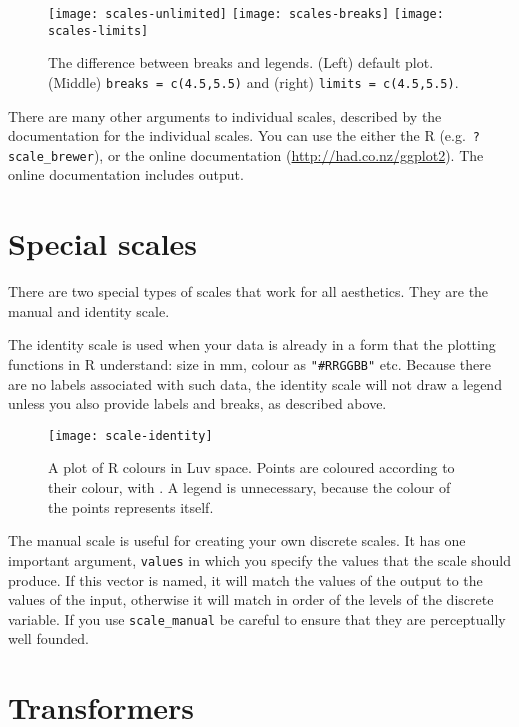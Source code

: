 \begin{figure}[htbp]
  \centering
    \texttt{[image: scales-unlimited]}
    \texttt{[image: scales-breaks]}
    \texttt{[image: scales-limits]}
  \caption{The difference between breaks and legends.  (Left) default plot.  (Middle)  {\tt breaks = c(4.5,5.5)} and (right) {\tt limits = c(4.5,5.5)}.}
  \label{fig:breaks_vs_legends}
\end{figure}

There are many other arguments to individual scales, described by the documentation for the individual scales.  You can use the either the R (e.g.\ {\tt ?scale\_brewer}), or the online documentation (\url{http://had.co.nz/ggplot2}).  The online documentation includes output.

\section{Special scales}
\label{sec:scale_special}

There are two special types of scales that work for all aesthetics.  They are the manual and identity scale.  

The identity scale is used when your data is already in a form that the plotting functions in R understand: size in mm, colour as \verb|"#RRGGBB"| etc. Because there are no labels associated with such data, the identity scale will not draw a legend unless you also provide labels and breaks, as described above. 

\begin{figure}[htbp]
  \centering
    \texttt{[image: scale-identity]}
  \caption{A plot of R colours in Luv space.  Points are coloured according to their colour, with .  A legend is unnecessary, because the colour of the points represents itself.}
  \label{fig:scale-identity}
\end{figure}

The manual scale is useful for creating your own discrete scales.  It has one important argument, \verb|values| in which you specify the values that the scale should produce.  If this vector is named, it will match the values of the output to the values of the input, otherwise it will match in order of the levels of the discrete variable.  If you use \verb|scale_manual| be careful to ensure that they are perceptually well founded.

\section{Transformers}
\label{sec:trans}

